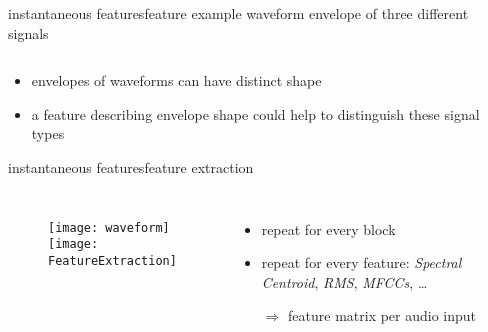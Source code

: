         \begin{frame}{instantaneous features}{feature example}
            waveform envelope of three different signals 
            
            
            \vspace{-2mm}
            \begin{columns}
                \centering
                    \hspace{8mm}
                \centering
                \centering
                    \hspace{-10mm}
            \end{columns}
            
            \bigskip
            \begin{itemize}
                \item<2->   envelopes of waveforms can have distinct shape
                \item<2->[$\Rightarrow$] a feature describing envelope shape could help to distinguish these signal types
            \end{itemize}
        \end{frame}

        \begin{frame}{instantaneous features}{feature extraction}
            \vspace{-5mm}
            \begin{columns}
            \vspace{-5mm}
            \begin{figure}
            \vspace{-8mm}
                \texttt{[image: waveform]}\\ \vspace{-3mm}
                \texttt{[image: FeatureExtraction]}
                
            \end{figure}
                \begin{itemize}
                    \item   repeat for every block
                    \item   repeat for every feature: \textit{Spectral Centroid}, \textit{RMS}, \textit{MFCCs}, \ldots
                    \bigskip
                    \item[$\Rightarrow$] feature matrix per audio input
                \end{itemize}
            \end{columns}
        \end{frame}

